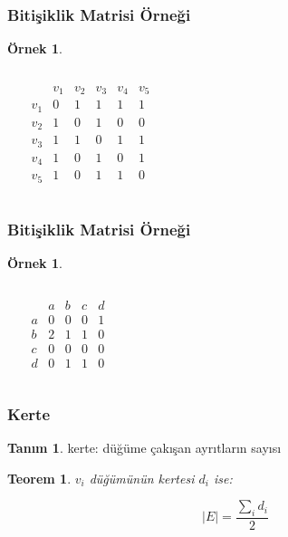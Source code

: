 \documentclass[dvipsnames]{beamer}
\theoremstyle{definition}
\newtheorem{tanim}[theorem]{Tanım}
\theoremstyle{example}
\newtheorem{ornek}[theorem]{Örnek}
\theoremstyle{plain}
\newtheorem{teorem}[theorem]{Teorem}
\begin{document}
\begin{frame}
  \frametitle{Bitişiklik Matrisi Örneği}

  \begin{ornek}
    \begin{columns}
      \begin{center}
      \end{center}

      \[
        \begin{array}{c|ccccc}
                & v_1 & v_2 & v_3 & v_4 & v_5\\\hline
            v_1 & 0 & 1 & 1 & 1 & 1\\
            v_2 & 1 & 0 & 1 & 0 & 0\\
            v_3 & 1 & 1 & 0 & 1 & 1\\
            v_4 & 1 & 0 & 1 & 0 & 1\\
            v_5 & 1 & 0 & 1 & 1 & 0
        \end{array}
      \]
    \end{columns}
  \end{ornek}
\end{frame}

\begin{frame}
  \frametitle{Bitişiklik Matrisi Örneği}

  \begin{ornek}
    \begin{columns}
    \begin{center}
    \end{center}

      \[
        \begin{array}{c|cccc}
              & a & b & c & d\\\hline
            a & 0 & 0 & 0 & 1\\
            b & 2 & 1 & 1 & 0\\
            c & 0 & 0 & 0 & 0\\
            d & 0 & 1 & 1 & 0
        \end{array}
      \]
    \end{columns}
  \end{ornek}
\end{frame}

\begin{frame}
  \frametitle{Kerte}

  \begin{tanim}
    \alert{kerte}: düğüme çakışan ayrıtların sayısı
  \end{tanim}

  \pause
  \begin{teorem}
    $v_i$ düğümünün kertesi $d_i$ ise:

    \[ |E| = \frac{\sum_i d_i}{2} \]
  \end{teorem}
\end{frame}
\end{document}
